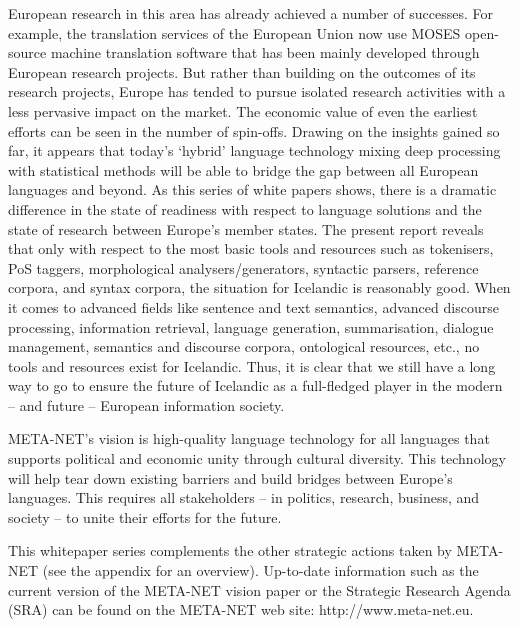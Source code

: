 \documentclass{../../metanetpaper}
\begin{document}
\begin{multicols}{2}
European research in this area has already achieved a number of successes. For example, the translation services of the European Union now use MOSES open-source machine translation software that has been mainly developed through European research projects. But rather than building on the outcomes of its research projects, Europe has tended to pursue isolated research activities with a less pervasive impact on the market. The economic value of even the earliest efforts can be seen in the number of spin-offs.  Drawing on the insights gained so far, it appears that today’s ‘hybrid’ language technology mixing deep processing with statistical methods will be able to bridge the gap between all European languages and beyond. As this series of white papers shows, there is a dramatic difference in the state of readiness with respect to language solutions and the state of research between Europe’s member states. The present report reveals that only with respect to the most basic tools and resources such as tokenisers, PoS taggers, morphological analysers/generators, syntactic parsers, reference corpora, and syntax corpora, the situation for Icelandic is reasonably good. When it comes to advanced fields like sentence and text semantics, advanced discourse processing, information retrieval, language generation, summarisation, dialogue management, semantics and discourse corpora, ontological resources, etc., no tools and resources exist for Icelandic. Thus, it is clear that we still have a long way to go to ensure the future of Icelandic as a full-fledged player in the modern -- and future -- European information society. 

META-NET’s vision is high-quality language technology for all languages that supports political and economic unity through cultural diversity. This technology will help tear down existing barriers and build bridges between Europe’s languages. This requires all stakeholders -- in politics, research, business, and society -- to unite their efforts for the future.

This whitepaper series complements the other strategic actions taken by META-NET (see the appendix for an overview). Up-to-date information such as the current version of the META-NET vision paper \cite{Meta1} or the Strategic Research Agenda (SRA) can be found on the META-NET web site: http://www.meta-net.eu.
\end{multicols}

\clearpage

\end{document}

